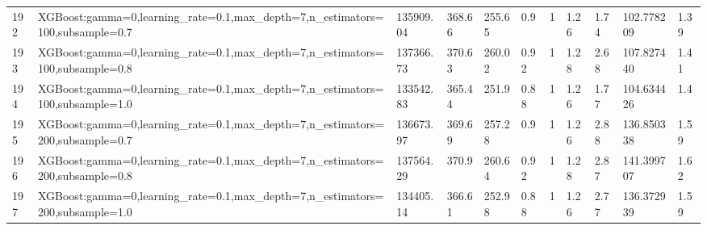 \begin{longtable}{C{0.8cm} L{2cm} C{1.15cm} C{1.15cm} C{1.15cm} C{1.15cm} C{0.85cm} C{1.25cm} C{1.2cm} C{1.5cm} C{1.0cm}}
192 & XGBoost:\newline gamma=0,\newline learning\_rate=0.1,\newline max\_depth=7,\newline n\_estimators=100,\newline subsample=0.7 & 135909.04 & 368.66 & 255.65 & 0.9 & 1 & 1.26 & 1.74 & 102.778209 & 1.39 \\
193 & XGBoost:\newline gamma=0,\newline learning\_rate=0.1,\newline max\_depth=7,\newline n\_estimators=100,\newline subsample=0.8 & 137366.73 & 370.63 & 260.02 & 0.92 & 1 & 1.28 & 2.68 & 107.827440 & 1.41 \\
194 & XGBoost:\newline gamma=0,\newline learning\_rate=0.1,\newline max\_depth=7,\newline n\_estimators=100,\newline subsample=1.0 & 133542.83 & 365.44 & 251.9 & 0.88 & 1 & 1.26 & 1.77 & 104.634426 & 1.4 \\
195 & XGBoost:\newline gamma=0,\newline learning\_rate=0.1,\newline max\_depth=7,\newline n\_estimators=200,\newline subsample=0.7 & 136673.97 & 369.69 & 257.28 & 0.9 & 1 & 1.26 & 2.88 & 136.850338 & 1.59 \\
196 & XGBoost:\newline gamma=0,\newline learning\_rate=0.1,\newline max\_depth=7,\newline n\_estimators=200,\newline subsample=0.8 & 137564.29 & 370.9 & 260.64 & 0.92 & 1 & 1.28 & 2.87 & 141.399707 & 1.62 \\
197 & XGBoost:\newline gamma=0,\newline learning\_rate=0.1,\newline max\_depth=7,\newline n\_estimators=200,\newline subsample=1.0 & 134405.14 & 366.61 & 252.98 & 0.88 & 1 & 1.26 & 2.77 & 136.372939 & 1.59 \\

\end{longtable}

